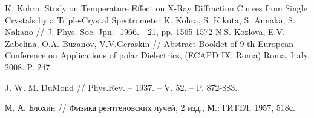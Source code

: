 \begin{thebibliography}{99}
      K. Kohra. Study on Temperature Effect on X-Ray
       Diffraction Curves from Single Crystals by a Triple-Crystal Spectrometer
       K. Kohra, S. Kikuta, S. Annaka, S. Nakano // J. Phys. Soc. Jpn. -1966. - 21, pp. 1565-1572
       N.S. Kozlova, E.V. Zabelina, O.A. Buzanov, V.V.Geraskin //
       Abstract Booklet of 9 th European Conference on Applications of
        polar Dielectrics, (ECAPD IX, Roma) Roma, Italy. 2008. P. 247.

    J. W. M. DuMond // Phys.Rev. – 1937. – V. 52. – P. 872-883.

    М. А. Блохин // Физика рентгеновских лучей, 2 изд., М.: ГИТТЛ, 1957, 518с.

\end{thebibliography}
